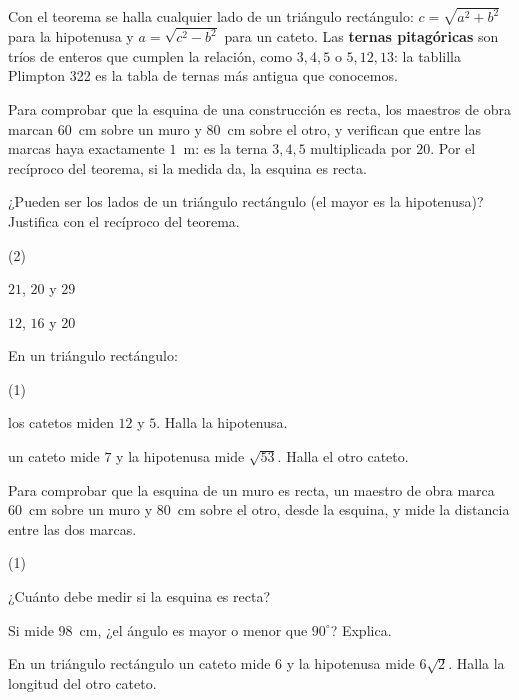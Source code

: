 \documentclass[11pt]{article}
\begin{document}
Con el teorema se halla cualquier lado de un triángulo rectángulo:
$c = \sqrt{a^2 + b^2}$ para la hipotenusa y $a = \sqrt{c^2 - b^2}$ para un
cateto. Las \textbf{ternas pitagóricas} son tríos de enteros que cumplen la
relación, como $3, 4, 5$ o $5, 12, 13$: la tablilla Plimpton 322 es la
tabla de ternas más antigua que conocemos.

\begin{aplicacion}
Para comprobar que la esquina de una construcción es recta, los maestros de
obra marcan $60$~cm sobre un muro y $80$~cm sobre el otro, y verifican que
entre las marcas haya exactamente $1$~m: es la terna $3, 4, 5$ multiplicada
por $20$. Por el recíproco del teorema, si la medida da, la esquina es
recta.
\end{aplicacion}

\begin{preguntas}
\pregunta ¿Pueden ser los lados de un triángulo rectángulo (el mayor es la
hipotenusa)? Justifica con el recíproco del teorema.
\begin{opciones*}(2)
  \item $21$, $20$ y $29$
  \item $12$, $16$ y $20$
\end{opciones*}
\espacio{2.5cm}
\pregunta En un triángulo rectángulo:
\begin{opciones*}(1)
  \item los catetos miden $12$ y $5$. Halla la hipotenusa.
  \item un cateto mide $7$ y la hipotenusa mide $\sqrt{53}$. Halla el otro
        cateto.
\end{opciones*}
\espacio{2.5cm}
\pregunta Para comprobar que la esquina de un muro es recta, un maestro de
obra marca $60$~cm sobre un muro y $80$~cm sobre el otro, desde la esquina,
y mide la distancia entre las dos marcas.
\begin{opciones*}(1)
  \item ¿Cuánto debe medir si la esquina es recta?
  \item Si mide $98$~cm, ¿el ángulo es mayor o menor que $90^\circ$? Explica.
\end{opciones*}
\espacio{3cm}
\pregunta En un triángulo rectángulo un cateto mide $6$ y la hipotenusa
mide $6\sqrt{2}$. Halla la longitud del otro cateto.
\espacio{2.5cm}
\end{preguntas}
\end{document}
